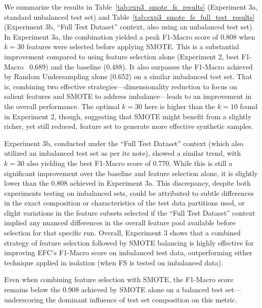 \documentclass[12pt]{article}
\begin{document}
We summarize the results in Table~\ref{tab:exp3_smote_fs_results} (Experiment 3a, standard unbalanced test set) and
Table~\ref{tab:exp3_smote_fs_full_test_results} (Experiment 3b, ``Full Test Dataset'' context, also using an unbalanced test set). 
In Experiment 3a, the combination yielded a peak F1-Macro score of 0.808 when $k=30$ features were selected before applying
SMOTE. This is a substantial improvement compared to using feature selection alone (Experiment 2, best F1-Macro ~0.689)
and the baseline (0.488). It also surpasses the F1-Macro achieved by Random Undersampling alone (0.652) on a similar imbalanced
test set. That is, combining two effective strategies---dimensionality reduction to focus on salient features and SMOTE to
address imbalance---leads to an improvement in the overall performance. The optimal $k=30$ here is higher than the $k=10$
found in Experiment 2, though, suggesting that SMOTE might benefit from a slightly richer, yet still reduced, feature
set to generate more effective synthetic samples. 

Experiment 3b, conducted under the ``Full Test Dataset'' context (which also utilized an imbalanced test set as per its
note), showed a similar trend, with $k=30$ also yielding the best F1-Macro score of 0.770. While this is still a significant
improvement over the baseline and feature selection alone, it is slightly lower than the 0.808 achieved in Experiment 3a.
This discrepancy, despite both experiments testing on imbalanced sets, could be attributed to subtle differences in the
exact composition or characteristics of the test data partitions used, or slight variations in the feature subsets selected
if the ``Full Test Dataset'' context implied any nuanced differences in the overall feature pool available before selection
for that specific run. Overall, Experiment 3 shows that a combined strategy of feature selection followed by SMOTE balancing is highly
effective for improving EFC's F1-Macro score on imbalanced test data, outperforming either technique applied in isolation
(when FS is tested on imbalanced data). 

\begin{highlightbox}
Even when combining feature selection with SMOTE, the F1-Macro score remains below the 0.908 achieved by SMOTE alone on
a balanced test set---underscoring the dominant influence of test set composition on this metric.
\end{highlightbox}
\end{document}
